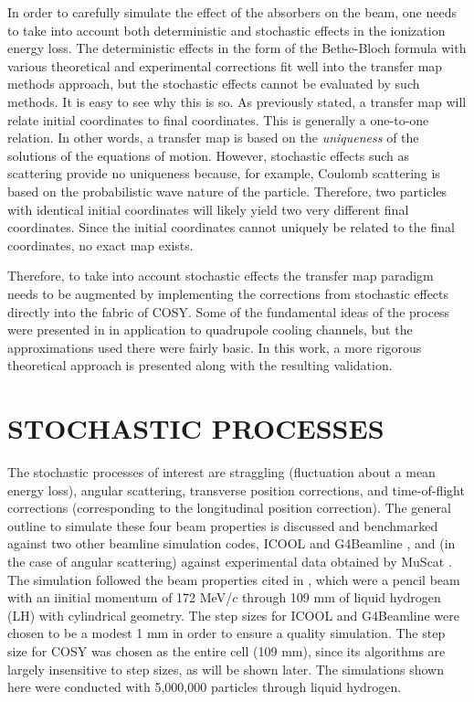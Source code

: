 \documentclass{jacow}
\begin{document}
In order to carefully simulate the effect of the absorbers on the beam, one needs to take into account both deterministic and stochastic effects in the ionization energy loss. The deterministic effects in the form of the Bethe-Bloch formula with various theoretical and experimental corrections fit well into the transfer map methods approach, but the stochastic effects cannot be evaluated by such methods. It is easy to see why this is so. As previously stated, a transfer map will relate initial coordinates to final coordinates. This is generally a one-to-one relation. In other words, a transfer map is based on the \textit{uniqueness} of the solutions of the equations of motion. However, stochastic effects such as scattering provide no uniqueness because, for example, Coulomb scattering is based on the probabilistic wave nature of the particle. Therefore, two particles with identical initial coordinates will likely yield two very different final coordinates. Since the initial coordinates cannot uniquely be related to the final coordinates, no exact map exists.

Therefore, to take into account stochastic effects the transfer map paradigm needs to be augmented by implementing the corrections from stochastic effects directly into the fabric of COSY. Some of the fundamental ideas of the process were presented in \cite{errede} in application to quadrupole cooling channels, but the approximations used there were fairly basic. In this work, a more rigorous theoretical approach is presented along with the resulting validation. 

\section{STOCHASTIC PROCESSES}
The stochastic processes of interest are straggling (fluctuation about a mean energy loss), angular scattering, transverse position corrections, and time-of-flight corrections (corresponding to the longitudinal position correction). The general outline to simulate these four beam properties is discussed and benchmarked against two other beamline simulation codes, ICOOL \cite{ICOOL} and G4Beamline \cite{G4BL}, and (in the case of angular scattering) against experimental data obtained by MuScat \cite{Muscat}. The simulation followed the beam properties cited in \cite{Muscat}, which were a pencil beam with an iinitial momentum of 172 MeV/$c$ through 109 mm of liquid hydrogen (LH) with cylindrical geometry. The step sizes for ICOOL and G4Beamline were chosen to be a modest 1 mm in order to ensure a quality simulation. The step size for COSY was chosen as the entire cell (109 mm), since its algorithms are largely insensitive to step sizes, as will be shown later. The simulations shown here were conducted with 5,000,000 particles through liquid hydrogen.
\end{document}
